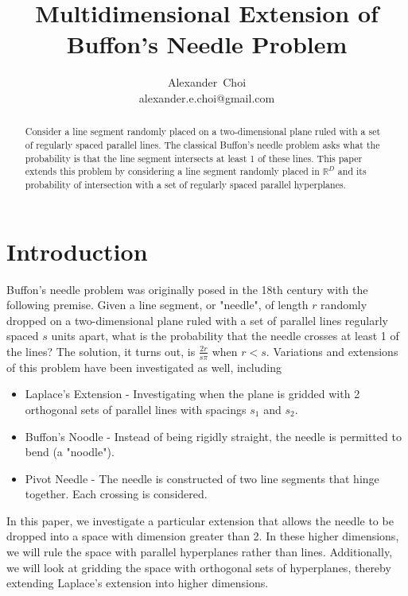 \documentclass{article}
\title{Multidimensional Extension of Buffon's Needle Problem}
\author{ Alexander~Choi\\
	alexander.e.choi@gmail.com
}
\begin{document}
\maketitle

\begin{abstract}
	Consider a line segment randomly placed on a two-dimensional plane ruled with a set of regularly spaced parallel lines. The classical Buffon's needle problem
    asks what the probability is that the line segment intersects at least 1 of these lines. This paper extends this problem by considering a line segment randomly
    placed in $\mathbb{R}^D$ and its probability of intersection with a set of regularly spaced parallel hyperplanes. 
\end{abstract}



\section{Introduction}
Buffon's needle problem was originally posed in the 18th century with the following premise. Given a line segment, or "needle", of length $r$ randomly dropped on a two-dimensional plane
ruled with a set of parallel lines regularly spaced $s$ units apart, what is the probability that the needle crosses at least 1 of the lines? The solution, it turns out, is
$\frac{2r}{s\pi}$ when $r<s$. Variations and extensions of this problem have been investigated as well, including
\begin{itemize}
	\item Laplace's Extension - Investigating when the plane is gridded with 2 orthogonal sets of parallel lines with spacings $s_1$ and $s_2$.
	\item Buffon's Noodle - Instead of being rigidly straight, the needle is permitted to bend (a "noodle").
	\item Pivot Needle - The needle is constructed of two line segments that hinge together. Each crossing is considered.
\end{itemize}

In this paper, we investigate a particular extension that allows the needle to be dropped into a space with dimension greater than 2. In these higher dimensions, we will rule the space
with parallel hyperplanes rather than lines. Additionally, we will look at gridding the space with orthogonal sets of hyperplanes, thereby extending Laplace's extension into higher dimensions.
\end{document}
